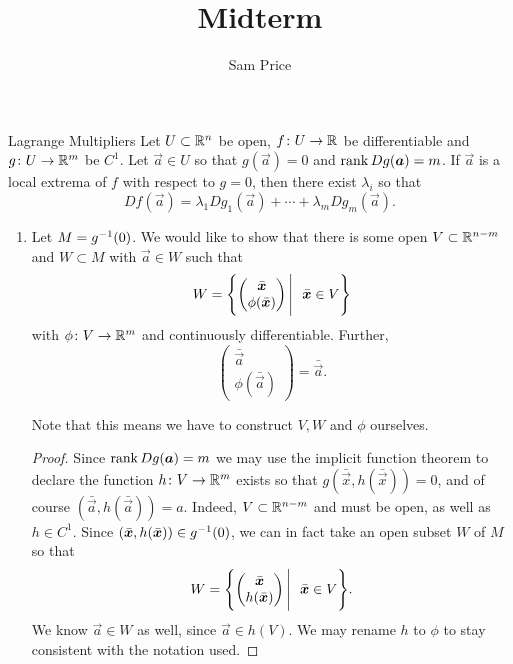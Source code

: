 \documentclass{article}
\author{Sam Price}
\title{Midterm}
\newcommand{\bv}[1]{\bar{\vec{#1}}}
\begin{document}
\maketitle

\begin{theorem}{Lagrange Multipliers}{}
  Let $U \subset \RR[n]$ be open, $f \from U \to \RR$ be differentiable and $g \from U \to \RR[m]$ be $C^{1}$.
  Let $\vec{a} \in U$ so that $g(\vec{a}) = 0$ and $\rank Dg(\vec{a}) = m$. If $\vec{a}$ is a local extrema of $f$ with respect to $g = 0$,
  then there exist $\lambda_{i}$ so that
  \[ Df(\vec{a}) = \lambda_{1}Dg_{1}(\vec{a}) + \cdots + \lambda_{m}Dg_{m}(\vec{a}). \]
\end{theorem}

\begin{enumerate}[start=1,label={(\alph*)}]
  \item Let $M = g\inv(0)$.
        We would like to show that there is some open $V \subset \RR[n-m]$ and $W \subset M$ with $\vec{a} \in W$ such that
        \[ W = \set*{ \begin{pmatrix} \bar{\vec{x}} \\ \phi(\bar{\vec{x}}) \end{pmatrix} \Bigg| \ \ \bar{\vec{x}} \in V } \]
        with $\phi \from V \to \RR[m]$ and continuously differentiable. Further,
        \[ \begin{pmatrix} \bar{\vec{a}} \\ \phi(\bar{\vec{a}}) \end{pmatrix} = \bar{\vec{a}}. \]

        Note that this means we have to construct $V, W$ and $\phi$ ourselves.

        \begin{proof}
          Since $\rank D g(\vec{a}) = m$ we may use the implicit function theorem to declare the function $h \from V \to \RR[m]$ exists so that
          $g(\bv{x}, h(\bv{x})) = 0$, and of course $(\bv{a}, h(\bv{a})) = a$. Indeed, $V \subset \RR[n - m]$ and must be open, as well as $h \in C^{1}$.
          Since $(\bv{x}, h(\bv{x})) \in g\inv(0)$, we can in fact take an open subset $W$ of $M$ so that
          \[ W = \set*{ \begin{pmatrix} \bv{x} \\ h(\bv{x}) \end{pmatrix} \Bigg| \ \ \bv{x} \in V }. \]
          We know $\vec{a} \in W$ as well, since $\vec{a} \in h(V)$. We may rename $h$ to $\phi$ to stay consistent with the notation used.
        \end{proof}


\end{enumerate}
\end{document}

